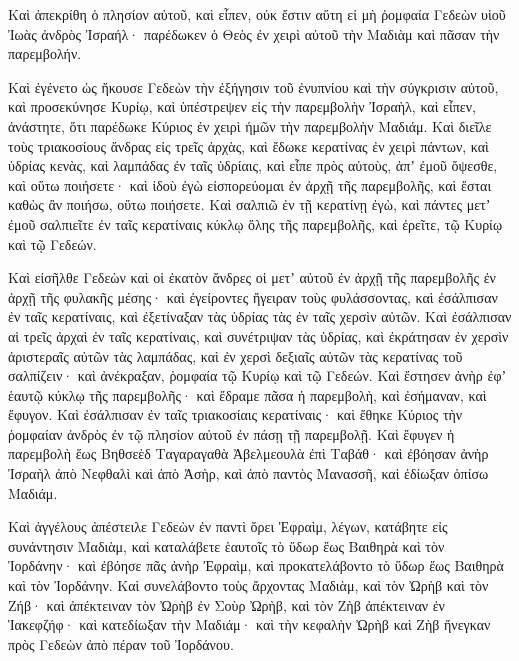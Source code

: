 {Καὶ ἀπεκρίθη ὁ πλησίον αὐτοῦ, καὶ εἶπεν, οὐκ ἔστιν αὕτη εἰ μὴ ῥομφαία Γεδεὼν υἱοῦ Ἰωὰς ἀνδρὸς Ἰσραήλ· παρέδωκεν ὁ Θεὸς ἐν χειρὶ αὐτοῦ τὴν Μαδιὰμ καὶ πᾶσαν τὴν παρεμβολήν.
\par }{\PP {}Καὶ ἐγένετο ὡς ἤκουσε Γεδεὼν τὴν ἐξήγησιν τοῦ ἐνυπνίου καὶ τὴν σύγκρισιν αὐτοῦ, καὶ προσεκύνησε Κυρίῳ, καὶ ὑπέστρεψεν εἰς τὴν παρεμβολὴν Ἰσραὴλ, καὶ εἶπεν, ἀνάστητε, ὅτι παρέδωκε Κύριος ἐν χειρὶ ἡμῶν τὴν παρεμβολὴν Μαδιάμ.
Καὶ διεῖλε τοὺς τριακοσίους ἄνδρας εἰς τρεῖς ἀρχὰς, καὶ ἔδωκε κερατίνας ἐν χειρὶ πάντων, καὶ ὑδρίας κενὰς, καὶ λαμπάδας ἐν ταῖς ὑδρίαις,
καὶ εἶπε πρὸς αὐτοὺς, ἀπʼ ἐμοῦ ὄψεσθε, καὶ οὕτω ποιήσετε· καὶ ἰδοὺ ἐγὼ εἰσπορεύομαι ἐν ἀρχῇ τῆς παρεμβολῆς, καὶ ἔσται καθὼς ἂν ποιήσω, οὕτω ποιήσετε.
Καὶ σαλπιῶ ἐν τῇ κερατίνῃ ἐγὼ, καὶ πάντες μετʼ ἐμοῦ σαλπιεῖτε ἐν ταῖς κερατίναις κύκλῳ ὅλης τῆς παρεμβολῆς, καὶ ἐρεῖτε, τῷ Κυρίῳ καὶ τῷ Γεδεών.
\par }{\PP {}Καὶ εἰσῆλθε Γεδεὼν καὶ οἱ ἐκατὸν ἄνδρες οἱ μετʼ αὐτοῦ ἐν ἀρχῇ τῆς παρεμβολῆς ἐν ἀρχῇ τῆς φυλακῆς μέσης· καὶ ἐγείροντες ἤγειραν τοὺς φυλάσσοντας, καὶ ἐσάλπισαν ἐν ταῖς κερατίναις, καὶ ἐξετίναξαν τὰς ὑδρίας τὰς ἐν ταῖς χερσὶν αὐτῶν.
Καὶ ἐσάλπισαν αἱ τρεῖς ἀρχαὶ ἐν ταῖς κερατίναις, καὶ συνέτριψαν τὰς ὑδρίας, καὶ ἐκράτησαν ἐν χερσὶν ἀριστεραῖς αὐτῶν τὰς λαμπάδας, καὶ ἐν χερσὶ δεξιαῖς αὐτῶν τὰς κερατίνας τοῦ σαλπίζειν· καὶ ἀνέκραξαν, ῥομφαία τῷ Κυρίῳ καὶ τῷ Γεδεών.
Καὶ ἔστησεν ἀνὴρ ἐφʼ ἑαυτῷ κύκλῳ τῆς παρεμβολῆς· καὶ ἔδραμε πᾶσα ἡ παρεμβολὴ, καὶ ἐσήμαναν, καὶ ἔφυγον.
Καὶ ἐσάλπισαν ἐν ταῖς τριακοσίαις κερατίναις· καὶ ἔθηκε Κύριος τὴν ῥομφαίαν ἀνδρὸς ἐν τῷ πλησίον αὐτοῦ ἐν πάσῃ τῇ παρεμβολῇ.
Καὶ ἔφυγεν ἡ παρεμβολὴ ἕως Βηθσεὲδ Ταγαραγαθὰ Ἀβελμεουλὰ ἐπὶ Ταβάθ· καὶ ἐβόησαν ἀνὴρ Ἰσραὴλ ἀπὸ Νεφθαλὶ καὶ ἀπὸ Ἀσὴρ, καὶ ἀπὸ παντὸς Μανασσῆ, καὶ ἐδίωξαν ὀπίσω Μαδιάμ.
\par }{\PP {}Καὶ ἀγγέλους ἀπέστειλε Γεδεὼν ἐν παντὶ ὄρει Ἐφραὶμ, λέγων, κατάβητε εἰς συνάντησιν Μαδιὰμ, καὶ καταλάβετε ἑαυτοῖς τὸ ὕδωρ ἕως Βαιθηρὰ καὶ τὸν Ἰορδάνην· καὶ ἐβόησε πᾶς ἀνὴρ Ἐφραὶμ, καὶ προκατελάβοντο τὸ ὕδωρ ἕως Βαιθηρὰ καὶ τὸν Ἰορδάνην.
Καὶ συνελάβοντο τοὺς ἄρχοντας Μαδιὰμ, καὶ τὸν Ὠρὴβ καὶ τὸν Ζήβ· καὶ ἀπέκτειναν τὸν Ὠρὴβ ἐν Σοὺρ Ὠρὴβ, καὶ τὸν Ζὴβ ἀπέκτειναν ἐν Ἱακεφζήφ· καὶ κατεδίωξαν τὴν Μαδιάμ· καὶ τὴν κεφαλὴν Ὠρὴβ καὶ Ζὴβ ἤνεγκαν πρὸς Γεδεὼν ἀπὸ πέραν τοῦ Ἰορδάνου.

}
